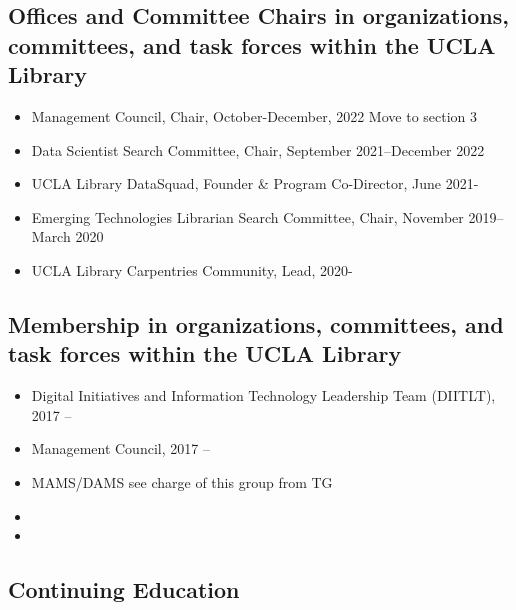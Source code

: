 
\subsection{Offices and Committee Chairs in organizations, committees, and task forces within the UCLA Library}

\begin{itemize}[label={},leftmargin=!,labelindent=5pt,itemindent=-15pt]
 \item Management Council, Chair, October-December, 2022 
  \todo Move to section 3
  \item Data Scientist Search Committee, Chair, September 2021--December 2022
   \item UCLA Library DataSquad, Founder & Program Co-Director, June 2021- 
  \item Emerging Technologies Librarian Search Committee, Chair, November 2019--March 2020
  \item UCLA Library Carpentries Community, Lead, 2020-
\end{itemize}


\subsection{Membership in organizations, committees, and task forces within the UCLA Library}

\begin{itemize}[label={},leftmargin=!,labelindent=5pt,itemindent=-15pt]
   \item Digital Initiatives and Information Technology Leadership Team (DIITLT), 2017 --
    \item Management Council, 2017 --
    \item MAMS/DAMS 
    \todo see charge of this group from TG 
    \item 
    \item 
\end{itemize}

\subsection{Continuing Education}


